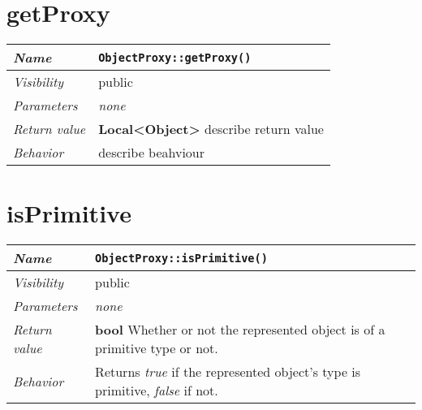  \section{getProxy}
\begin{longtable}{p{3cm} @{\hskip 1cm} p{12cm}}
 \hline
\textit{Name} & \texttt{ObjectProxy::getProxy()}\\
\hline
 \textit{Visibility} & public\\
\hline
\textit{Parameters} & \textit{none}\\
\hline
\textit{Return value} & \textbf{Local<Object>} describe return value\\
  \hline
 \textit{Behavior} & describe beahviour \\
\hline
\end{longtable} \pagebreak
 \section{isPrimitive}
\begin{longtable}{p{3cm} @{\hskip 1cm} p{12cm}}
 \hline
\textit{Name} & \texttt{ObjectProxy::isPrimitive()}\\
\hline
 \textit{Visibility} & public\\
\hline
\textit{Parameters} & \textit{none}\\
\hline
\textit{Return value} & \textbf{bool} Whether or not the represented object is of a primitive type or not.\\
  \hline
  \textit{Behavior} & Returns \textit{true} if the represented object's type is primitive, \textit{false} if not.\\
\hline
\end{longtable} \pagebreak
